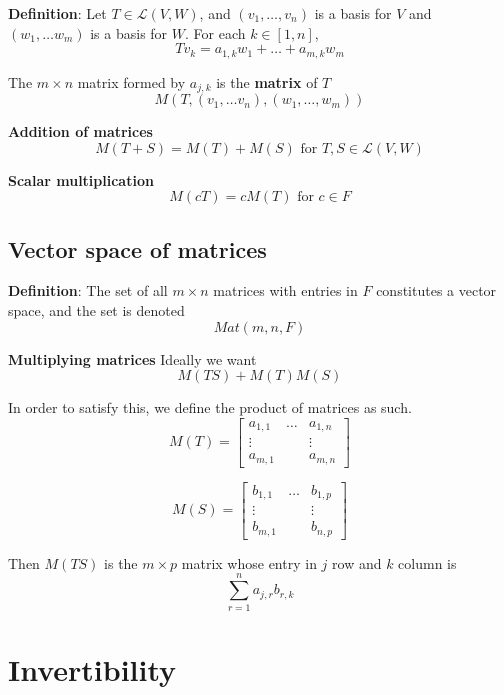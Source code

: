 \documentclass[a4paper, 10pt]{report}
\begin{document}
\begin{framed}
   \textbf{Definition}: Let $T \in \mathcal{L}(V, W)$, and $ \left( v_1, \hdots, v_n \right) $ is a basis for $V$ and $ \left( w_1, \hdots w_m \right) $ is a basis for $W$. For each $k \in [1, n]$, 
    \[
       T v_k = a_{1, k} w_1 + \hdots + a_{m, k} w_m
   \] 

   The $m \times n$  matrix formed by $a_{j, k} $ is the \textbf{matrix} of $T$ 
   \[
     M \left( T, (v_1, \hdots v_n), (w_1, \hdots, w_m) \right) 
   \] 
\end{framed}

\textbf{Addition of matrices}
\[
   M(T + S) = M(T) + M(S) \text{ for } T, S \in \mathcal{L}(V, W)
\] 

\textbf{Scalar multiplication}
\[
   M(cT) = cM(T) \text{ for } c \in F 
\] 

\subsection{Vector space of matrices}

\begin{framed}
   \textbf{Definition}: The set of all $m \times n$ matrices with entries in $F$ constitutes a vector space, and the set is denoted
   \[
     Mat(m, n, F)
   \] 
\end{framed}

\textbf{Multiplying matrices}
Ideally we want 
\[
  M(TS) + M(T) M(S)
\] 

In order to satisfy this, we define the product of matrices as such. \\
\[
  M(T) = \begin{bmatrix} 
     a_{1, 1}&  \hdots &a_{1, n} \\
     \vdots&  & \vdots \\
     a_{m, 1}&  & a_{m, n}
  \end{bmatrix}
\] 

\[
  M(S) = \begin{bmatrix} 
     b_{1, 1}&  \hdots &b_{1, p} \\
     \vdots&  & \vdots \\
     b_{m, 1}&  & b_{n, p}
  \end{bmatrix}
\] 

Then $M(TS)$ is the $m \times p$ matrix whose entry in $j$ row and $k$ column is 
\[
   \sum_{r = 1}^n a_{j, r} b_{r, k}
\] 


\section{Invertibility}
\end{document}

